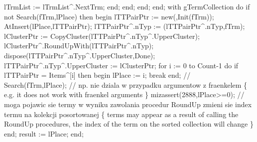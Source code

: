                   lTrmList := lTrmList^.NextTrm;
               end;
            end;
         end;
   end;
   with gTermCollection do
      if not Search(fTrm,lPlace) then
      begin
         lTTPairPtr := new(,Init(fTrm));
         AtInsert(lPlace,lTTPairPtr);
         lTTPairPtr^.nTyp := (lTTPairPtr^.nTyp,fTrm);
         lClusterPtr := CopyCluster(lTTPairPtr^.nTyp^.UpperCluster);
         lClusterPtr^.RoundUpWith(lTTPairPtr^.nTyp);
         dispose(lTTPairPtr^.nTyp^.UpperCluster,Done);
         lTTPairPtr^.nTyp^.UpperCluster := lClusterPtr;
         for i  :=  0 to Count-1 do
            if lTTPairPtr = Items^[i] then
            begin
               lPlace := i;
               break
            end;
         //    Search(fTrm,lPlace);       // np. nie dziala w przypadku argumentow z fraenkelem
         \{ e.g. it does not work with fraenkel arguments \}
         mizassert(2888,lPlace>=0);
         // moga pojawic sie termy w  wyniku zawolania procedur RoundUp zmieni sie index termu na kolekcji posortowanej
         \{ terms may appear as a result of calling the RoundUp 
           procedures, the index of the term on the sorted collection 
           will change \} 
      end;
   result := lPlace;
end;
\eatline
{}\nwendcode{}\nwdocspar
